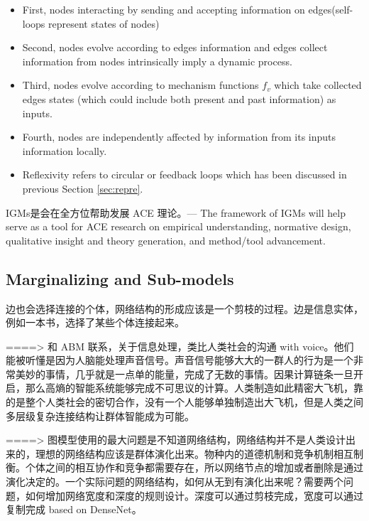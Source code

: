 \documentclass{article}
\theoremstyle{definition}
\theoremstyle{remark}
\theoremstyle{definition}
\begin{document}
\begin{CJK*}{UTF8}{gbsn}
\begin{itemize}
    \item First, nodes interacting by sending and accepting information on edges(self-loops represent states of nodes)
    \item Second, nodes evolve according to edges information and edges collect information from nodes intrinsically imply a dynamic process.
    \item Third, nodes evolve according to mechanism functions $f_v$ which take collected edges states (which could include both present and past information) as inputs.
    \item Fourth, nodes are independently affected by information from its inputs information locally.
    \item Reflexivity refers to circular or feedback loops which has been discussed in previous Section \ref{sec:repre}.
\end{itemize} 


IGMs是会在全方位帮助发展 ACE 理论。---
The framework of IGMs will help serve as a tool for ACE research on empirical understanding, normative design, qualitative insight and theory generation, and method/tool advancement. 






\subsection{Marginalizing and Sub-models}

边也会选择连接的个体，网络结构的形成应该是一个剪枝的过程。边是信息实体，例如一本书，选择了某些个体连接起来。


====> 和 ABM 联系，关于信息处理，类比人类社会的沟通 with voice。他们能被听懂是因为人脑能处理声音信号。声音信号能够大大的一群人的行为是一个非常美妙的事情，几乎就是一点单的能量，完成了无数的事情。因果计算链条一旦开启，那么高熵的智能系统能够完成不可思议的计算。人类制造如此精密大飞机，靠的是整个人类社会的密切合作，没有一个人能够单独制造出大飞机，但是人类之间多层级复杂连接结构让群体智能成为可能。


====> 图模型使用的最大问题是不知道网络结构，网络结构并不是人类设计出来的，理想的网络结构应该是群体演化出来。物种内的道德机制和竞争机制相互制衡。个体之间的相互协作和竞争都需要存在，所以网络节点的增加或者删除是通过演化决定的。一个实际问题的网络结构，如何从无到有演化出来呢？需要两个问题，如何增加网络宽度和深度的规则设计。深度可以通过剪枝完成，宽度可以通过复制完成 based on DenseNet。





\end{CJK*}
\end{document}
